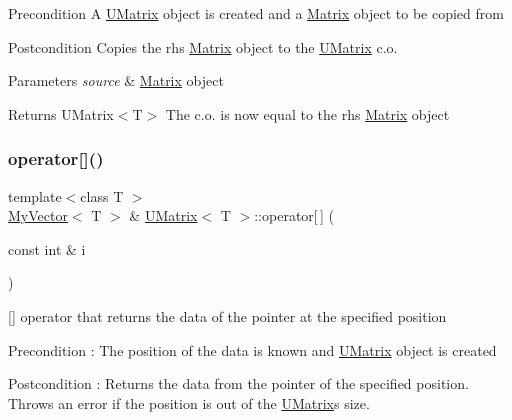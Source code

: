 \begin{DoxyPrecond}{Precondition}
A \mbox{\hyperlink{class_u_matrix}{U\+Matrix}} object is created and a \mbox{\hyperlink{class_matrix}{Matrix}} object to be copied from 
\end{DoxyPrecond}
\begin{DoxyPostcond}{Postcondition}
Copies the rhs \mbox{\hyperlink{class_matrix}{Matrix}} object to the \mbox{\hyperlink{class_u_matrix}{U\+Matrix}} c.\+o. 
\end{DoxyPostcond}

\begin{DoxyParams}{Parameters}
{\em source} & \mbox{\hyperlink{class_matrix}{Matrix}} object \\
\hline
\end{DoxyParams}
\begin{DoxyReturn}{Returns}
U\+Matrix$<$\+T$>$ The c.\+o. is now equal to the rhs \mbox{\hyperlink{class_matrix}{Matrix}} object 
\end{DoxyReturn}
\mbox{\label{class_u_matrix_a0dea1e82fbf5ae67bec479c070b185dc}} 
\subsubsection{\texorpdfstring{operator[]()}{operator[]()}\hspace{0.1cm}{\footnotesize\ttfamily [1/2]}}
{\footnotesize\ttfamily template$<$class T $>$ \\
\mbox{\hyperlink{class_my_vector}{My\+Vector}}$<$ T $>$ \& \mbox{\hyperlink{class_u_matrix}{U\+Matrix}}$<$ T $>$\+::operator\mbox{[}$\,$\mbox{]} (\begin{DoxyParamCaption}\item[{const int \&}]{i }\end{DoxyParamCaption})\hspace{0.3cm}{\ttfamily [virtual]}}



\mbox{[}\mbox{]} operator that returns the data of the pointer at the specified position 

\begin{DoxyPrecond}{Precondition}
\+: The position of the data is known and \mbox{\hyperlink{class_u_matrix}{U\+Matrix}} object is created 
\end{DoxyPrecond}
\begin{DoxyPostcond}{Postcondition}
\+: Returns the data from the pointer of the specified position. Throws an error if the position is out of the \mbox{\hyperlink{class_u_matrix}{U\+Matrix}}\textquotesingle{}s size. 
\end{DoxyPostcond}

